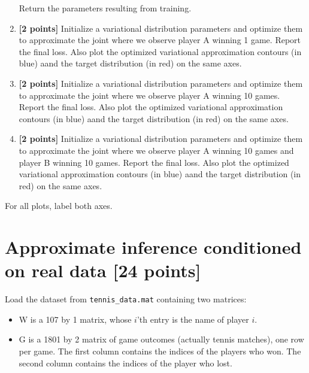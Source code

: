 \documentclass{article}
\begin{document}
\begin{enumerate}[label=(\alph*)]
\begin{enumerate}
    \end{enumerate}
    Return the parameters resulting from training.
  \item {\bf [2 points]} Initialize a variational distribution parameters and optimize them to approximate the joint
    where we observe player A winning 1 game.
    Report the final loss.
    Also plot the optimized variational approximation contours (in blue) aand the target distribution (in red) on the same axes.
  \item {\bf [2 points]} Initialize a variational distribution parameters and optimize them to approximate the joint
    where we observe player A winning 10 games.
    Report the final loss.
    Also plot the optimized variational approximation contours (in blue) aand the target distribution (in red) on the same axes.
  \item {\bf [2 points]} Initialize a variational distribution parameters and optimize them to approximate the joint
    where we observe player A winning 10 games and player B winning 10 games.
    Report the final loss.
    Also plot the optimized variational approximation contours (in blue) aand the target distribution (in red) on the same axes.
\end{enumerate}
For all plots, label both axes.

\pagebreak
\section{Approximate inference conditioned on real data [24 points]}
Load the dataset from \texttt{tennis\_data.mat} containing two matrices:

\begin{itemize}
	\item W is a 107 by 1 matrix, whose $i$’th entry is the name of player $i$.
	\item G is a 1801 by 2 matrix of game outcomes (actually tennis matches), one row per game.
The first column contains the indices of the players who won.
The second column contains the indices of the player who lost.
\end{itemize}
\end{document}
